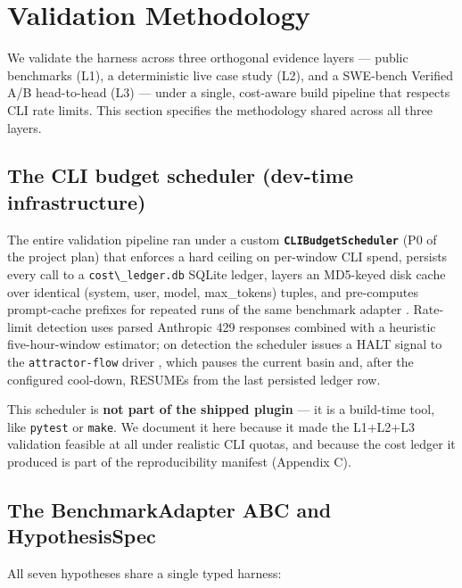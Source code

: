 \section{Validation Methodology}\label{validation-methodology}

We validate the harness across three orthogonal evidence layers --- public benchmarks (L1), a deterministic live case study (L2), and a SWE-bench Verified A/B head-to-head (L3) --- under a single, cost-aware build pipeline that respects CLI rate limits. This section specifies the methodology shared across all three layers.

\subsection{The CLI budget scheduler (dev-time infrastructure)}\label{the-cli-budget-scheduler-dev-time-infrastructure}

The entire validation pipeline ran under a custom \textbf{\passthrough{\lstinline!CLIBudgetScheduler!}} (P0 of the project plan) that enforces a hard ceiling on per-window CLI spend, persists every call to a \passthrough{\lstinline!cost\_ledger.db!} SQLite ledger, layers an MD5-keyed disk cache over identical (system, user, model, max\_tokens) tuples, and pre-computes prompt-cache prefixes for repeated runs of the same benchmark adapter \citep{anthropic2024promptcaching}. Rate-limit detection uses parsed Anthropic 429 responses combined with a heuristic five-hour-window estimator; on detection the scheduler issues a HALT signal to the \passthrough{\lstinline!attractor-flow!} driver \citep{attractorflowplugin}, which pauses the current basin and, after the configured cool-down, RESUMEs from the last persisted ledger row.

This scheduler is \textbf{not part of the shipped plugin} --- it is a build-time tool, like \passthrough{\lstinline!pytest!} or \passthrough{\lstinline!make!}. We document it here because it made the L1+L2+L3 validation feasible at all under realistic CLI quotas, and because the cost ledger it produced is part of the reproducibility manifest (Appendix C).

\subsection{The BenchmarkAdapter ABC and HypothesisSpec}\label{the-benchmarkadapter-abc-and-hypothesisspec}

All seven hypotheses share a single typed harness:

